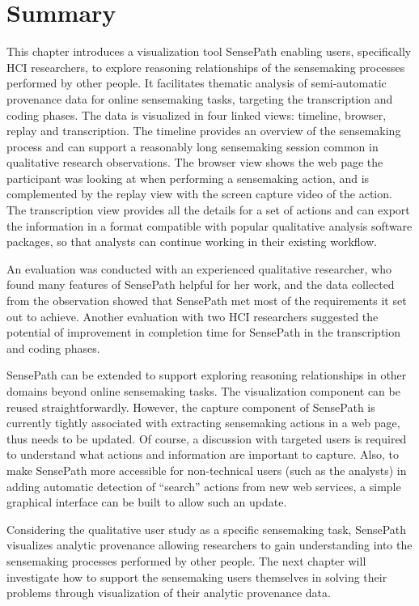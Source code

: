 \section{Summary}
This chapter introduces a visualization tool SensePath enabling users, specifically HCI researchers, to explore reasoning relationships of the sensemaking processes performed by other people. It facilitates thematic analysis of semi-automatic provenance data for online sensemaking tasks, targeting the transcription and coding phases. The data is visualized in four linked views: timeline, browser, replay and transcription. The timeline provides an overview of the sensemaking process and can support a reasonably long sensemaking session common in qualitative research observations. The browser view shows the web page the participant was looking at when performing a sensemaking action, and is complemented by the replay view with the screen capture video of the action. The transcription view provides all the details for a set of actions and can export the information in a format compatible with popular qualitative analysis software packages, so that analysts can continue working in their existing workflow.

An evaluation was conducted with an experienced qualitative researcher, who found many features of SensePath helpful for her work, and the data collected from the observation showed that SensePath met most of the requirements it set out to achieve. Another evaluation with two HCI researchers suggested the potential of improvement in completion time for SensePath in the transcription and coding phases.

SensePath can be extended to support exploring reasoning relationships in other domains beyond online sensemaking tasks. The visualization component can be reused straightforwardly. However, the capture component of SensePath is currently tightly associated with extracting sensemaking actions in a web page, thus needs to be updated. Of course, a discussion with targeted users is required to understand what actions and information are important to capture.  Also, to make SensePath more accessible for non-technical users (such as the analysts) in adding automatic detection of ``search'' actions from new web services, a simple graphical interface can be built to allow such an update.

Considering the qualitative user study as a specific sensemaking task, SensePath visualizes analytic provenance allowing researchers to gain understanding into the sensemaking processes performed by other people. The next chapter will investigate how to support the sensemaking users themselves in solving their problems through visualization of their analytic provenance data.
